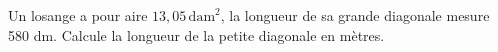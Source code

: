 \medskip

Un losange a pour aire $13,05\,\text{dam}^2$, la longueur de sa grande diagonale mesure 580 dm.
Calcule la longueur de la petite diagonale en mètres.